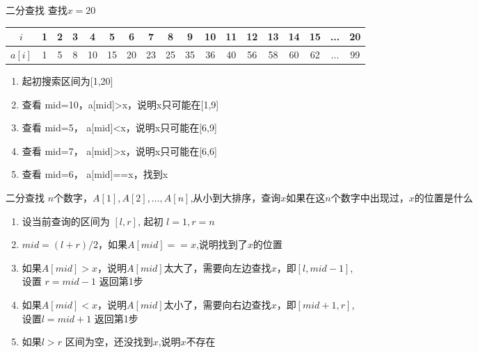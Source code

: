 \documentclass[aspectratio=169,xcolor=dvipsnames]{beamer}
\begin{document}
\begin{frame}{二分查找}
    查找$x=20$
    \begin{table}[ht]
        \centering
        \begin{tabular}{|c|ccccccccccccccccc|}
        \hline
        $i$ & 1 & 2 & 3 & 4 & 5 & 6 & 7 & 8 & 9 & 10 & 11 & 12 & 13 & 14 & 15 & ... & 20 \\
        \hline
        $a[i]$ & 1 & 5 & 8 & 10 & 15 & 20 & 23 & 25 & 35 & 36 & 40 & 56 & 58 & 60 & 62 & ... & 99 \\
        \hline
        \end{tabular}
    \end{table}
        
    \begin{enumerate}
        \item 起初搜索区间为[1,20]
        \item 查看 mid=10，a[mid]>x，说明x只可能在[1,9]
        \item 查看 mid=5， a[mid]<x，说明x只可能在[6,9]
        \item 查看 mid=7， a[mid]>x，说明x只可能在[6,6]
        \item 查看 mid=6， a[mid]==x，找到x

    \end{enumerate}
\end{frame}

\begin{frame}[fragile]{二分查找}
    $n$个数字，$A[1],A[2],\ldots,A[n]$,从小到大排序，查询$x$如果在这$n$个数字中出现过，$x$的位置是什么
    \begin{enumerate}
        \item 设当前查询的区间为 $[l,r]$, 起初 $l=1,r=n$
        \item $mid=(l+r)/2$，如果$A[mid]==x$,说明找到了$x$的位置
        \item 如果$A[mid]>x$，说明$A[mid]$太大了，需要向左边查找$x$，即$[l,mid-1]$, \\设置 $r=mid-1$ 返回第1步
        \item 如果$A[mid]<x$，说明$A[mid]$太小了，需要向右边查找$x$，即$[mid+1,r]$,\\设置$l=mid+1$ 返回第1步
        \item 如果$l>r$ 区间为空，还没找到$x$,说明$x$不存在
    \end{enumerate}
\end{frame}
\end{document}
